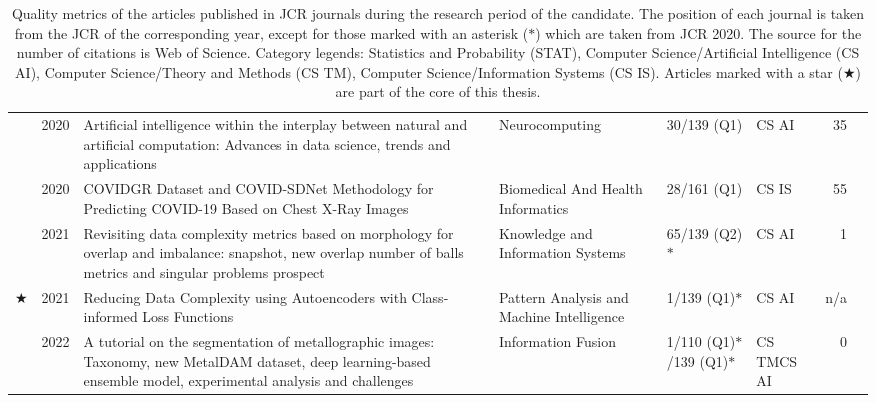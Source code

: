 \begin{table*}[htbp]
{\begin{tabular}{crp{5.5cm}p{3cm}p{1.6cm}p{0.9cm}rc}
        & 2020 
        &   Artificial intelligence within the interplay between natural and artificial computation: Advances in data science, trends and applications 
        & Neurocomputing
        & 30/139 (Q1) & CS AI & 35 & \cite{interplay} \\

        & 2020 
        &    COVIDGR Dataset and COVID-SDNet Methodology for Predicting COVID-19 Based on Chest X-Ray Images 
        & Biomedical And Health Informatics
        & 28/161 (Q1) & CS IS & 55 & \cite{covid} \\

        & 2021 
        & Revisiting data complexity metrics based on morphology for overlap and imbalance: snapshot, new overlap number of balls metrics and singular problems prospect 
        & Knowledge and Information Systems
        & 65/139 (Q2)$\ast$ & CS AI & 1 & \cite{complexity} \\

        $\bigstar$ & 2021 
        &  Reducing Data Complexity using Autoencoders with Class-informed Loss Functions 
        & Pattern Analysis and Machine Intelligence
        & 1/139 (Q1)$\ast$ & CS AI & n/a & \cite{charte2021reducing} \\

        & 2022 
        &  A tutorial on the segmentation of metallographic images: Taxonomy, new MetalDAM dataset, deep learning-based ensemble model, experimental analysis and challenges 
        & Information Fusion
        & {1/110 (Q1)$\ast$\newline 3/139 (Q1)$\ast$} 
        & {CS TM\newline CS AI} & 0 & \cite{metallography} \\
        \bottomrule
    \end{tabular}}
    \caption[Quality metrics of the articles published in JCR journals during the research period.]{\label{tbl:journals}Quality metrics of the articles published in JCR journals during the research period of the candidate. The position of each journal is taken from the JCR of the corresponding year, except for those marked with an asterisk ($\ast$) which are taken from JCR 2020. The source for the number of citations is Web of Science. Category legends: Statistics and Probability (STAT), Computer Science/Artificial Intelligence (CS AI), Computer Science/Theory and Methods (CS TM), Computer Science/Information Systems (CS IS). Articles marked with a star ($\bigstar$) are part of the core of this thesis.}
\end{table*}

